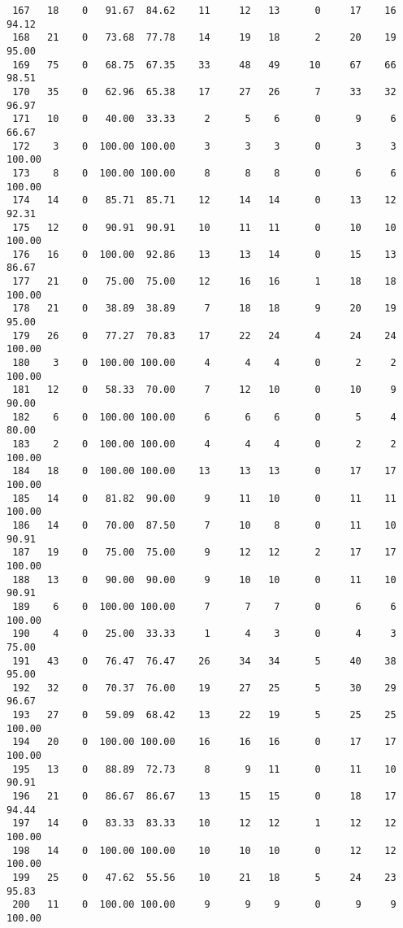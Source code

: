 \begin{verbatim}
 167   18    0   91.67  84.62    11     12   13      0     17    16    94.12
 168   21    0   73.68  77.78    14     19   18      2     20    19    95.00
 169   75    0   68.75  67.35    33     48   49     10     67    66    98.51
 170   35    0   62.96  65.38    17     27   26      7     33    32    96.97
 171   10    0   40.00  33.33     2      5    6      0      9     6    66.67
 172    3    0  100.00 100.00     3      3    3      0      3     3   100.00
 173    8    0  100.00 100.00     8      8    8      0      6     6   100.00
 174   14    0   85.71  85.71    12     14   14      0     13    12    92.31
 175   12    0   90.91  90.91    10     11   11      0     10    10   100.00
 176   16    0  100.00  92.86    13     13   14      0     15    13    86.67
 177   21    0   75.00  75.00    12     16   16      1     18    18   100.00
 178   21    0   38.89  38.89     7     18   18      9     20    19    95.00
 179   26    0   77.27  70.83    17     22   24      4     24    24   100.00
 180    3    0  100.00 100.00     4      4    4      0      2     2   100.00
 181   12    0   58.33  70.00     7     12   10      0     10     9    90.00
 182    6    0  100.00 100.00     6      6    6      0      5     4    80.00
 183    2    0  100.00 100.00     4      4    4      0      2     2   100.00
 184   18    0  100.00 100.00    13     13   13      0     17    17   100.00
 185   14    0   81.82  90.00     9     11   10      0     11    11   100.00
 186   14    0   70.00  87.50     7     10    8      0     11    10    90.91
 187   19    0   75.00  75.00     9     12   12      2     17    17   100.00
 188   13    0   90.00  90.00     9     10   10      0     11    10    90.91
 189    6    0  100.00 100.00     7      7    7      0      6     6   100.00
 190    4    0   25.00  33.33     1      4    3      0      4     3    75.00
 191   43    0   76.47  76.47    26     34   34      5     40    38    95.00
 192   32    0   70.37  76.00    19     27   25      5     30    29    96.67
 193   27    0   59.09  68.42    13     22   19      5     25    25   100.00
 194   20    0  100.00 100.00    16     16   16      0     17    17   100.00
 195   13    0   88.89  72.73     8      9   11      0     11    10    90.91
 196   21    0   86.67  86.67    13     15   15      0     18    17    94.44
 197   14    0   83.33  83.33    10     12   12      1     12    12   100.00
 198   14    0  100.00 100.00    10     10   10      0     12    12   100.00
 199   25    0   47.62  55.56    10     21   18      5     24    23    95.83
 200   11    0  100.00 100.00     9      9    9      0      9     9   100.00

\end{verbatim}
